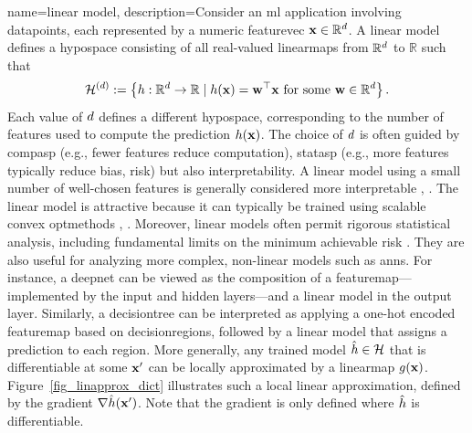 {name={linear model}, 
	description={Consider an \gls{ml} application involving \glspl{datapoint}, each represented 
		by a numeric \gls{featurevec} ${\bf x} \in \mathbb{R}^{d}$. A linear \gls{model} defines 
		a \gls{hypospace} consisting of all real-valued \glspl{linearmap} from $\mathbb{R}^{d}$ to $\mathbb{R}$ such that
		\begin{equation}
			\label{equ_def_lin_model_hypspace_dict}
			\mathcal{H}^{(d)} := \left\{ h: \mathbb{R}^{d} \rightarrow \mathbb{R} \mid h({\bf x}) = {\bf w}^{\top} {\bf x} \text{ for some } {\bf w} \in \mathbb{R}^{d} \right\}.
		\end{equation}
		Each value of $d$ defines a different \gls{hypospace}, corresponding to the number of 
		\glspl{feature} used to compute the \gls{prediction} $h({\bf x})$. The choice of 
		$d$ is often guided by \gls{compasp} (e.g., fewer features reduce computation), \gls{statasp} 
		(e.g., more features typically reduce \gls{bias}, \gls{risk}) but also \gls{interpretability}. 
		A linear \gls{model} using a small number of well-chosen \glspl{feature} is generally considered 
		more interpretable \cite{rudin2019stop}, \cite{Ribeiro2016}.
		The linear \gls{model} is attractive because it can typically be trained using scalable \gls{convex} \glspl{optmethod} \cite{hastie01statisticallearning}, \cite{BertsekasNonLinProgr}. 
		Moreover, linear \glspl{model} often permit rigorous 
		statistical analysis, including fundamental limits on the \gls{minimum} achievable \gls{risk} \cite{Wain2019}. 
		They are also useful for analyzing more complex, non-linear \glspl{model} such as \glspl{ann}. For instance, 
		a \gls{deepnet} can be viewed as the composition of a \gls{featuremap}—implemented by the input and 
		hidden layers—and a linear \gls{model} in the output layer. Similarly, a \gls{decisiontree} can be interpreted 
		as applying a one-hot encoded \gls{featuremap} based on \glspl{decisionregion}, followed by a linear 
		\gls{model} that assigns a \gls{prediction} to each region.
		More generally, any trained \gls{model} $\hat{h} \in \mathcal{H}$ that is 
		\gls{differentiable} at some ${\bf x}'$ can be locally approximated by a \gls{linearmap} 
		$g({\bf x})$. Figure~\ref{fig_linapprox_dict} illustrates such a local linear approximation, 
		defined by the \gls{gradient} $\nabla \hat{h}({\bf x}')$. Note that the \gls{gradient} 
		is only defined where $\hat{h}$ is \gls{differentiable}.
}}

